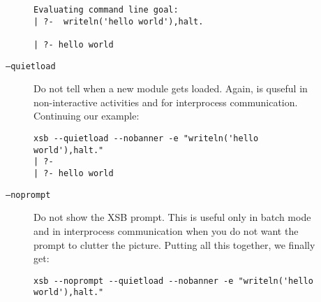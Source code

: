 \begin{description}
\begin{description}
\begin{verbatim}
Evaluating command line goal:  
| ?-  writeln('hello world'),halt.

| ?- hello world
\end{verbatim}
%
  \item[{\tt --quietload}] Do not tell when a new module gets
    loaded. Again, is quseful in non-interactive activities and for
    interprocess communication.  Continuing our example:
\begin{verbatim}
xsb --quietload --nobanner -e "writeln('hello world'),halt."
| ?- 
| ?- hello world
\end{verbatim}
%
  \item[{\tt --noprompt}] Do not show the XSB prompt. This is useful only in batch
    mode and in interprocess communication when you do not want the prompt
    to clutter the picture.  Putting all this together, we finally get: 
\begin{verbatim}
xsb --noprompt --quietload --nobanner -e "writeln('hello world'),halt."


\end{verbatim}
\end{description}
\end{description}
